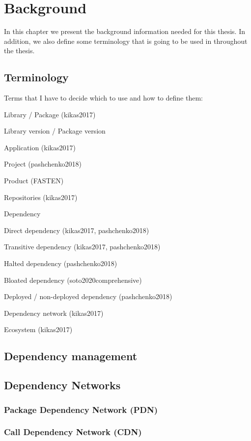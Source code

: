 \chapter{Background}\label{ch:Background}
In this chapter we present the background information needed for this thesis. In addition, we also define some terminology that is going to be used in throughout the thesis.

\section{Terminology}

Terms that I have to decide which to use and how to define them:

Library / Package (kikas2017)

Library version / Package version

Application (kikas2017)

Project (pashchenko2018)

Product (FASTEN)

Repositories (kikas2017)

Dependency

Direct dependency (kikas2017, pashchenko2018)

Transitive dependency (kikas2017, pashchenko2018)

Halted dependency (pashchenko2018)

Bloated dependency (soto2020comprehensive)

Deployed / non-deployed dependency (pashchenko2018)

Dependency network (kikas2017)

Ecosystem (kikas2017)

\reminder{}

\section{Dependency management}

\section{Dependency Networks}
\subsection{Package Dependency Network (PDN)}
\subsection{Call Dependency Network (CDN)}

